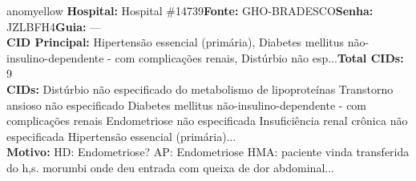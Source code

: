 \documentclass[a4paper,10pt]{article}
\begin{document}
\begin{anomalycard}[Interna\c{c}\~{a}o \#118693 | Pac. \#98466 | MODERADO (z=2.87) | LOS: 6d | 24/02/2026\,$\to$\,02/03/2026]{anomyellow}
\textbf{Hospital:} Hospital \#14739\quad \textbf{Fonte:} GHO-BRADESCO\quad \textbf{Senha:} JZLBFH4\quad \textbf{Guia:} ---\\

\textbf{CID Principal:} {\small Hipertensão essencial (primária), Diabetes mellitus não-insulino-dependente - com complicações renais, Distúrbio não esp...}\quad\textbf{Total CIDs:} 9\\

\textbf{CIDs:} {\scriptsize Distúrbio não especificado do metabolismo de lipoproteínas \textbar{} Transtorno ansioso não especificado \textbar{} Diabetes mellitus não-insulino-dependente - com complicações renais \textbar{} Endometriose não especificada \textbar{} Insuficiência renal crônica não especificada \textbar{} Hipertensão essencial (primária)...}\\

\textbf{Motivo:} {\scriptsize HD: Endometriose?  AP: Endometriose HMA: paciente vinda transferida do h,s. morumbi onde deu entrada com queixa de dor abdominal...}\\




\end{anomalycard}
\end{document}
